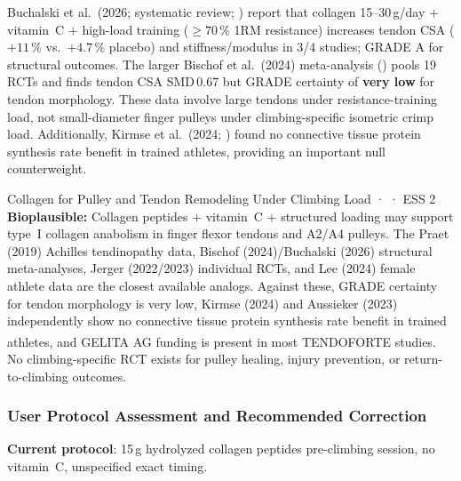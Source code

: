 Buchalski et al.\ (2026; systematic review; \cite{BJAL26}) report that collagen 15--30\,g/day $+$ vitamin~C $+$ high-load training (${\geq}70\,\%$ 1RM resistance) increases tendon CSA ($+11\,\%$ vs.\ $+4.7\,\%$ placebo) and stiffness/modulus in 3/4 studies; GRADE A for structural outcomes. The larger Bischof et al.\ (2024) meta-analysis (\cite{BMSK24}) pools 19 RCTs and finds tendon CSA SMD\,0.67 but GRADE certainty of \textbf{very low} for tendon morphology. These data involve large tendons under resistance-training load, not small-diameter finger pulleys under climbing-specific isometric crimp load. Additionally, Kirmse et al.\ (2024; \cite{KLV+24}) found no connective tissue protein synthesis rate benefit in trained athletes, providing an important null counterweight.

\begin{bioplausbox}{Collagen for Pulley and Tendon Remodeling Under Climbing Load · \bioplausible · ESS 2}
\textbf{Bioplausible:} Collagen peptides $+$ vitamin~C $+$ structured loading may support type~I collagen anabolism in finger flexor tendons and A2/A4 pulleys. The Praet (2019) Achilles tendinopathy data, Bischof (2024)/Buchalski (2026) structural meta-analyses, Jerger (2022/2023) individual RCTs, and Lee (2024) female athlete data are the closest available analogs. Against these, GRADE certainty for tendon morphology is very low, Kirmse (2024) and Aussieker (2023) independently show no connective tissue protein synthesis rate benefit in trained athletes, and GELITA AG funding is present in most TENDOFORTE\textsuperscript{\textregistered} studies. No climbing-specific RCT exists for pulley healing, injury prevention, or return-to-climbing outcomes.
\end{bioplausbox}

\subsubsection{User Protocol Assessment and Recommended Correction}

\textbf{Current protocol}: 15\,g hydrolyzed collagen peptides pre-climbing session, no vitamin~C, unspecified exact timing.

